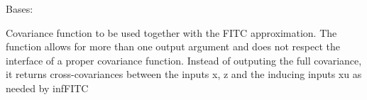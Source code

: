 \documentclass[letterpaper,10pt,english]{sphinxmanual}
\begin{document}

\begin{fulllineitems}
\label{pyGPs.Core:pyGPs.Core.cov.FITCOfKernel}
Bases: {\hyperref[pyGPs.Core:pyGPs.Core.cov.Kernel]{}}

Covariance function to be used together with the FITC approximation.
The function allows for more than one output argument and does not respect the
interface of a proper covariance function. 
Instead of outputing the full covariance, it returns cross-covariances between
the inputs x, z and the inducing inputs xu as needed by infFITC

\begin{fulllineitems}
\label{pyGPs.Core:pyGPs.Core.cov.FITCOfKernel.getCovMatrix}
\end{fulllineitems}


\begin{fulllineitems}
\label{pyGPs.Core:pyGPs.Core.cov.FITCOfKernel.getDerMatrix}
\end{fulllineitems}


\begin{fulllineitems}
\label{pyGPs.Core:pyGPs.Core.cov.FITCOfKernel.hyp}
\end{fulllineitems}


\end{fulllineitems}

\end{document}
